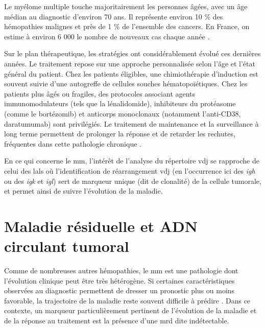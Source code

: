 Le myélome multiple touche majoritairement les personnes âgées, avec un âge
médian au diagnostic d'environ 70 ans. Il représente environ 10 \% des
hémopathies malignes et près de 1 \% de l'ensemble des cancers. En France, on
estime à environ 6 000 le nombre de nouveaux cas chaque année
\cite{spfSurviePersonnesAtteintes}.


\vspace{1em}

Sur le plan thérapeutique, les stratégies ont considérablement évolué ces
dernières années. Le traitement repose sur une approche personnalisée selon
l'âge et l'état général du patient. Chez les patients éligibles, une
chimiothérapie d'induction est souvent suivie d'une autogreffe de cellules
souches hématopoïétiques. Chez les patients plus âgés ou fragiles, des
protocoles associant agents immunomodulateurs (tels que la lénalidomide),
inhibiteurs du protéasome (comme le bortézomib) et anticorps monoclonaux
(notamment l'anti-CD38, daratumumab) sont privilégiés. Le traitement de
maintenance et la surveillance à long terme permettent de prolonger la réponse
et de retarder les rechutes, fréquentes dans cette pathologie chronique
\cite{cowanDiagnosisManagementMultiple2022a}.

\vspace{1em}

En ce qui concerne le \gls{mm}, l'intérêt de l'analyse du répertoire \gls{vdj}
se rapproche de celui des \glspl{lal} où l'identification de réarrangement
\gls{vdj} (en l'occurrence ici des \textit{\gls{igh}} ou des \textit{\gls{igk}}
et \textit{\gls{igl}}) sert de marqueur unique (dit de clonalité) de la cellule
tumorale, et permet ainsi de suivre l'évolution de la maladie.

\section{Maladie résiduelle et ADN circulant tumoral}

Comme de nombreuses autres hémopathies, le \gls{mm} est une pathologie dont
l'évolution clinique peut être très hétérogène. Si certaines caractéristiques
observées au diagnostic permettent de dresser un pronostic plus ou moins
favorable, la trajectoire de la maladie reste souvent difficile à prédire
\cite{hanamuraMultipleMyelomaHighrisk2022}. Dans ce contexte, un marqueur
particulièrement pertinent de l'évolution de la maladie et de la réponse au
traitement est la présence d'une \gls{mrd} dite indétectable.

